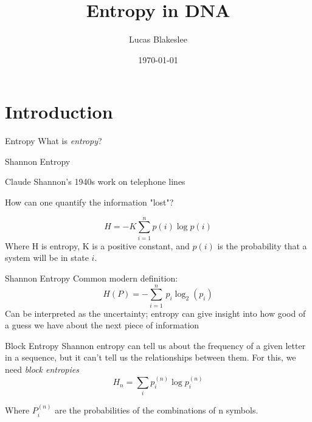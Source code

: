 \documentclass[12pt]{beamer}
\begin{document}
	\author{Lucas Blakeslee}
	\title{Entropy in DNA}
	\date{\today}
	\begin{frame}[plain]
		\maketitle
	\end{frame}
	
	\section{Introduction}
	
	\begin{frame}{Entropy}
		What is \emph{entropy}?
	\end{frame}

	\begin{frame}{Shannon Entropy}
		\begin{list}{}
			\item Claude Shannon's 1940s work on telephone lines
			\item How can one quantify the information "lost"?
		\end{list}
	\begin{equation}
		H=-K\sum _{i=1}^{n}p(i)\log p(i)
	\end{equation}
	Where H is entropy, K is a positive constant, and $p(i)$ is the probability that a system will be in state $i$.
	\end{frame}

	\begin{frame}{Shannon Entropy}
		Common modern definition:
		\begin{equation}
			H(P) = -\sum_{i=1}^n\, p_i\log_2 (p_i)
		\end{equation}
		Can be interpreted as the uncertainty; entropy can give insight into how good of a guess we have about the next piece of information
	\end{frame}

	\begin{frame}{Block Entropy}
		Shannon entropy can tell us about the frequency of a given letter in a sequence, but it can't tell us the relationships between them. For this, we need \emph{block entropies}
	\begin{equation}
		H_{n}= \sum _{i}p_{i}^{(n)}\log p_{i}^{(n)}
	\end{equation}
	
	Where $P_{i}^{(n)}$ are the probabilities of the combinations of n symbols. 
	\end{frame}
\end{document}

